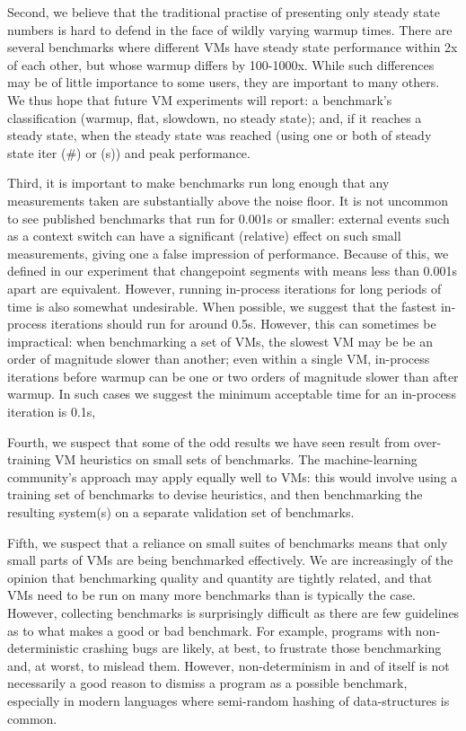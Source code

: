 \documentclass[acmsmall]{acmart}\settopmatter{printfolios=true}
\begin{document}
Second, we believe that the traditional practise of presenting only steady state
numbers is hard to defend in the face of wildly varying warmup times. There
are several benchmarks where different VMs have steady state
performance within 2x of each other, but whose warmup differs by 100-1000x.
While such differences may be of little importance to some users,
they are important to many others. We thus hope that future VM experiments will
report: a benchmark's classification (warmup, flat, slowdown, no steady state);
and, if it reaches a steady state, when the steady state was reached (using
one or both of steady state iter (\#) or (s)) and peak performance.

Third, it is important to make benchmarks run long enough that any measurements
taken are substantially above the noise floor. It is not uncommon to see
published benchmarks that run for 0.001s or smaller: external events such as a context switch
can have a significant (relative) effect on such small measurements,
giving one a false impression of performance. Because of this,
we defined in our experiment that changepoint segments with means less than 0.001s
apart are equivalent. However, running in-process iterations for long periods
of time is also somewhat undesirable. When possible, we suggest that
the fastest in-process iterations should run for around 0.5s. However, this can
sometimes be impractical: when benchmarking a set of VMs, the slowest VM may be
be an order of magnitude slower than another; even within a single VM,
in-process iterations before warmup can be one or two orders of magnitude slower
than after warmup. In such cases we suggest the minimum acceptable time for an
in-process iteration is 0.1s,

Fourth, we suspect that some of the odd results we have seen result from
over-training VM heuristics on small sets of benchmarks. The machine-learning
community's approach may apply equally well to VMs: this would involve
using a training set of benchmarks to devise heuristics, and then benchmarking
the resulting system(s) on a separate validation set of benchmarks.

Fifth, we suspect that a reliance on small suites of benchmarks means that
only small parts of VMs are being benchmarked effectively. We are increasingly
of the opinion that benchmarking quality and quantity are tightly related, and
that VMs need to be run on many more benchmarks than is typically the case.
However, collecting benchmarks is surprisingly difficult as there are few
guidelines as to what makes a good or bad benchmark. For example, programs with
non-deterministic crashing bugs are likely, at best, to frustrate those benchmarking and,
at worst, to mislead them. However, non-determinism in and of itself is not
necessarily a good reason to dismiss a program as a possible benchmark,
especially in modern languages where semi-random hashing of data-structures is
common.
\end{document}
